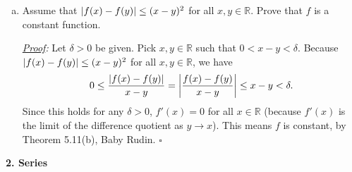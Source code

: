 \documentclass[11pt]{article}
\newcommand{\f}[2]{\frac{#1}{#2}}
\begin{document}
\begin{enumerate}[(a)]
	
	\item Assume that $\abs{f(x) - f(y)} \leq (x-y)^2$ for all $x,y\in \mathbb{R}$. Prove that $f$ is a constant function. 
	
	
	
	\noindent \textit{\underline{Proof}:} Let $\delta > 0$ be given. Pick $x,y \in \mathbb{R}$ such that $0 < x-y< \delta$. Because $\abs{f(x) - f(y)} \leq (x-y)^2$ for all $x,y\in \mathbb{R}$, we have
	\begin{align*}
	0 \leq \f{\abs{f(x) - f(y)}}{x-y} = \abs{\f{f(x) - f(y)}{x-y}} \leq x-y < \delta.
	\end{align*}
	Since this holds for any $\delta > 0$, $f'(x) = 0$ for all $x\in\mathbb{R}$ (because $f'(x)$ is the limit of the difference quotient as $y\to x$). This means $f$ is constant, by Theorem 5.11(b), Baby Rudin. \hfill $\square$
\end{enumerate}






\newpage



\noindent \textbf{2. Series}
\end{document}
